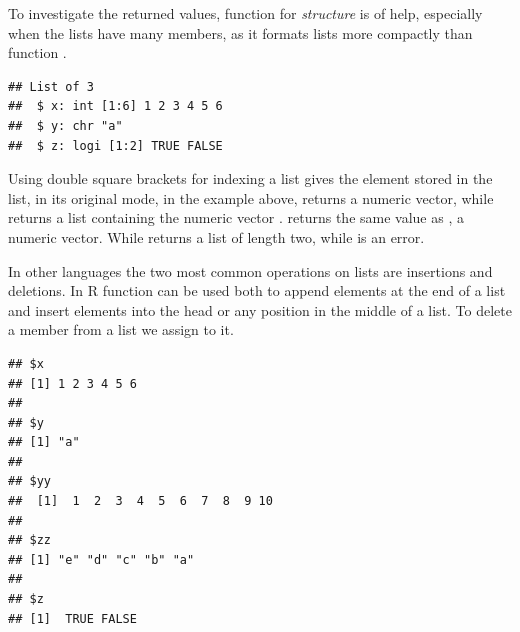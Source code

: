 \documentclass[krantz2]{krantz}\usepackage{knitr}%
\begin{document}
To investigate the returned values, function  for \emph{structure} is of help, especially when the lists have many members, as it formats lists more compactly than function .

\begin{knitrout}\footnotesize
{}\color{fgcolor}\begin{kframe}
\begin{alltt}
\end{alltt}
\begin{verbatim}
## List of 3
##  $ x: int [1:6] 1 2 3 4 5 6
##  $ y: chr "a"
##  $ z: logi [1:2] TRUE FALSE
\end{verbatim}
\end{kframe}
\end{knitrout}

Using\qRoperator{[[]]} double square brackets for indexing a list gives the element stored in the list, in its original mode, in the example above,  returns a numeric vector, while  returns a list containing the numeric vector .  returns the same value as , a numeric vector. While  returns a list of length two, while  is an error.

In other languages the two most common operations on lists are insertions and deletions. In R function  can be used both to append elements at the end of a list and insert elements into the head or any position in the middle of a list. To delete a member from a list we assign  to it.

\begin{knitrout}\footnotesize
{}\color{fgcolor}\begin{kframe}
\begin{alltt}
 \hlkwb{<-}  \hlstd{(} \hlstd{=} \hlopt{:}\hlstd{,}  \hlstd{= letters[}\hlopt{:}\hlstd{]),} \hlstd{)}
\end{alltt}
\begin{verbatim}
## $x
## [1] 1 2 3 4 5 6
## 
## $y
## [1] "a"
## 
## $yy
##  [1]  1  2  3  4  5  6  7  8  9 10
## 
## $zz
## [1] "e" "d" "c" "b" "a"
## 
## $z
## [1]  TRUE FALSE
\end{verbatim}
\end{kframe}
\end{knitrout}
\end{document}
